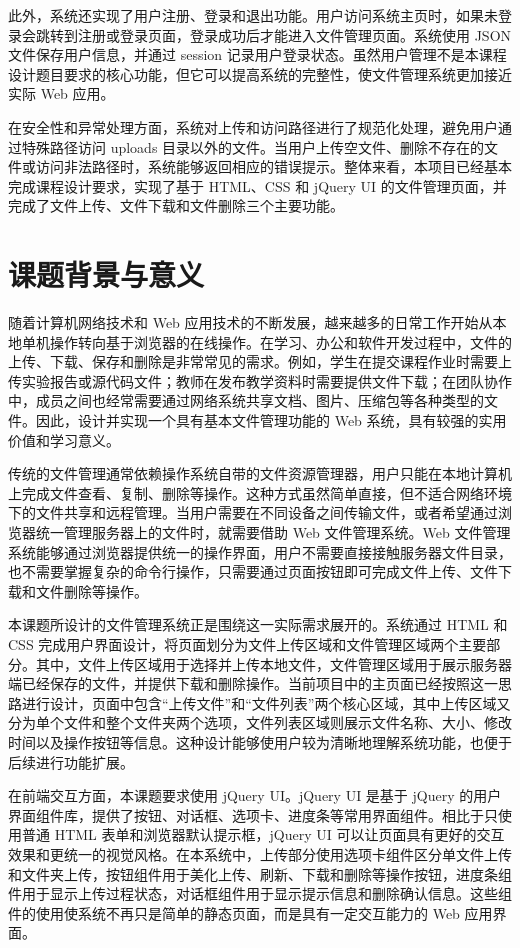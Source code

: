 \documentclass[UTF8,zihao=-4]{ctexrep}
\begin{document}
此外，系统还实现了用户注册、登录和退出功能。用户访问系统主页时，如果未登录会跳转到注册或登录页面，登录成功后才能进入文件管理页面。系统使用 JSON 文件保存用户信息，并通过 session 记录用户登录状态。虽然用户管理不是本课程设计题目要求的核心功能，但它可以提高系统的完整性，使文件管理系统更加接近实际 Web 应用。

在安全性和异常处理方面，系统对上传和访问路径进行了规范化处理，避免用户通过特殊路径访问 uploads 目录以外的文件。当用户上传空文件、删除不存在的文件或访问非法路径时，系统能够返回相应的错误提示。整体来看，本项目已经基本完成课程设计要求，实现了基于 HTML、CSS 和 jQuery UI 的文件管理页面，并完成了文件上传、文件下载和文件删除三个主要功能。

\section{课题背景与意义}

随着计算机网络技术和 Web 应用技术的不断发展，越来越多的日常工作开始从本地单机操作转向基于浏览器的在线操作。在学习、办公和软件开发过程中，文件的上传、下载、保存和删除是非常常见的需求。例如，学生在提交课程作业时需要上传实验报告或源代码文件；教师在发布教学资料时需要提供文件下载；在团队协作中，成员之间也经常需要通过网络系统共享文档、图片、压缩包等各种类型的文件。因此，设计并实现一个具有基本文件管理功能的 Web 系统，具有较强的实用价值和学习意义。

传统的文件管理通常依赖操作系统自带的文件资源管理器，用户只能在本地计算机上完成文件查看、复制、删除等操作。这种方式虽然简单直接，但不适合网络环境下的文件共享和远程管理。当用户需要在不同设备之间传输文件，或者希望通过浏览器统一管理服务器上的文件时，就需要借助 Web 文件管理系统。Web 文件管理系统能够通过浏览器提供统一的操作界面，用户不需要直接接触服务器文件目录，也不需要掌握复杂的命令行操作，只需要通过页面按钮即可完成文件上传、文件下载和文件删除等操作。

本课题所设计的文件管理系统正是围绕这一实际需求展开的。系统通过 HTML 和 CSS 完成用户界面设计，将页面划分为文件上传区域和文件管理区域两个主要部分。其中，文件上传区域用于选择并上传本地文件，文件管理区域用于展示服务器端已经保存的文件，并提供下载和删除操作。当前项目中的主页面已经按照这一思路进行设计，页面中包含“上传文件”和“文件列表”两个核心区域，其中上传区域又分为单个文件和整个文件夹两个选项，文件列表区域则展示文件名称、大小、修改时间以及操作按钮等信息。这种设计能够使用户较为清晰地理解系统功能，也便于后续进行功能扩展。

在前端交互方面，本课题要求使用 jQuery UI。jQuery UI 是基于 jQuery 的用户界面组件库，提供了按钮、对话框、选项卡、进度条等常用界面组件。相比于只使用普通 HTML 表单和浏览器默认提示框，jQuery UI 可以让页面具有更好的交互效果和更统一的视觉风格。在本系统中，上传部分使用选项卡组件区分单文件上传和文件夹上传，按钮组件用于美化上传、刷新、下载和删除等操作按钮，进度条组件用于显示上传过程状态，对话框组件用于显示提示信息和删除确认信息。这些组件的使用使系统不再只是简单的静态页面，而是具有一定交互能力的 Web 应用界面。
\end{document}
